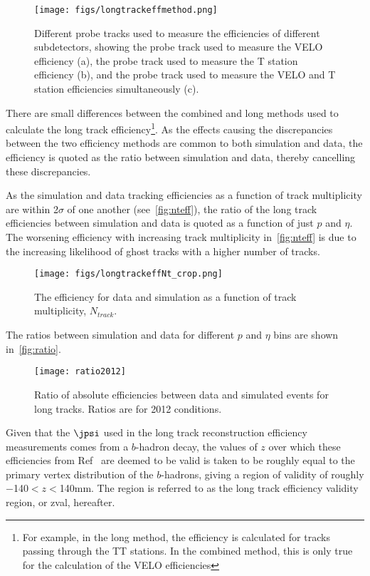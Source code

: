 \begin{figure}[h]
\centering
\texttt{[image: figs/longtrackeffmethod.png]}
\caption{Different probe tracks used to measure the efficiencies of different subdetectors, showing the probe track used to measure the VELO efficiency (a), the probe track used to measure the T station efficiency (b), and the probe track used to measure the VELO and T station efficiencies simultaneously (c).}
\label{fig:tracks}
\end{figure}

There are small differences between the combined and long methods used to calculate the long track efficiency\footnote{For example, in the long method, the efficiency is calculated for tracks passing through the TT stations. In the combined method, this is only true for the calculation of the VELO efficiencies}. As the effects causing the discrepancies between the two efficiency methods are common to both simulation and data, the efficiency is quoted as the ratio between simulation and data, thereby cancelling these discrepancies.


As the simulation and data tracking efficiencies as a function of track multiplicity are within 2$\sigma$ of one another (see~\autoref{fig:nteff}), the ratio of the long track efficiencies between simulation and data is quoted as a function of just $p$ and $\eta$. The worsening efficiency with increasing track multiplicity in~\autoref{fig:nteff} is due to the increasing likelihood of \gls{ghost} tracks with a higher number of tracks.
\begin{figure}[h]
\centering
\texttt{[image: figs/longtrackeffNt\_crop.png]}
\caption{The efficiency for data and simulation as a function of track multiplicity, $N_{track}$.}
\label{fig:nteff}
\end{figure}
The ratios between simulation and data for different $p$ and $\eta$ bins are shown in~\autoref{fig:ratio}.
\begin{figure}[h]
\centering
\texttt{[image: ratio2012]}
\caption{Ratio of absolute efficiencies between data and simulated events for long tracks. Ratios are for 2012 conditions\cite{LHCB-DP-2013-002}.}%
\label{fig:ratio}
\end{figure}
Given that the $\jpsi$ used in the long track reconstruction efficiency measurements comes from a $b$-hadron decay, the values of $z$ over which these efficiencies from Ref~\cite{LHCB-DP-2013-002} are deemed to be valid is taken to be roughly equal to the primary vertex distribution of the $b$-hadrons, giving a region of validity of roughly $-$140$<z<$140\:mm. The region is referred to as the long track efficiency validity region, or \gls{zval}, hereafter.%

